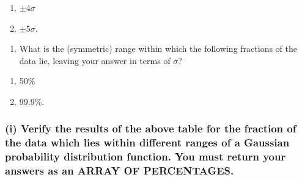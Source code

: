 \documentclass[11pt]{article}
\providecommand{\tightlist}{%
      \setlength{\itemsep}{0pt}\setlength{\parskip}{0pt}}
\begin{document}
\begin{enumerate}
\def\labelenumi{(\alph{enumi})}
\tightlist
\item
  \(\pm4\sigma\) 
\item
  \(\pm5\sigma\).\\
\end{enumerate}

\begin{enumerate}
\def\labelenumi{(\roman{enumi})}
\setcounter{enumi}{2}
\tightlist
\item
  What is the (symmetric) range within which the following fractions of
  the data lie, leaving your answer in terms of \(\sigma\)?
\end{enumerate}

\begin{enumerate}
\def\labelenumi{(\alph{enumi})}
\tightlist
\item
  50\% 
\item
  99.9\%.
\end{enumerate}

    \hypertarget{i-verify-the-results-of-the-above-table-for-the-fraction-of-the-data-which-lies-within-different-ranges-of-a-gaussian-probability-distribution-function.-you-must-return-your-answers-as-an-array-of-percentages.}{%
\subsubsection{(i) Verify the results of the above table for the
fraction of the data which lies within different ranges of a Gaussian
probability distribution function. You must return your answers as an
ARRAY OF
PERCENTAGES.}\label{i-verify-the-results-of-the-above-table-for-the-fraction-of-the-data-which-lies-within-different-ranges-of-a-gaussian-probability-distribution-function.-you-must-return-your-answers-as-an-array-of-percentages.}}
\end{document}
